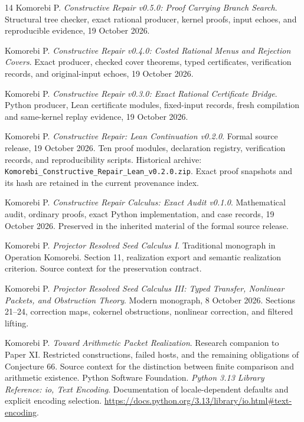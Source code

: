 \documentclass[11pt,letterpaper,oneside,openany]{book}
\theoremstyle{quiet}
\begin{document}
\backmatter
\begin{thebibliography}{14}
Komorebi P. \emph{Constructive Repair v0.5.0: Proof Carrying Branch Search}. Structural tree checker, exact rational producer, kernel proofs, input echoes, and reproducible evidence, 19 October 2026.

Komorebi P. \emph{Constructive Repair v0.4.0: Costed Rational Menus and Rejection Covers}. Exact producer, checked cover theorems, typed certificates, verification records, and original-input echoes, 19 October 2026.

Komorebi P. \emph{Constructive Repair v0.3.0: Exact Rational Certificate Bridge}. Python producer, Lean certificate modules, fixed-input records, fresh compilation and same-kernel replay evidence, 19 October 2026.

Komorebi P. \emph{Constructive Repair: Lean Continuation v0.2.0}. Formal source release, 19 October 2026. Ten proof modules, declaration registry, verification records, and reproducibility scripts. Historical archive: \nolinkurl{Komorebi_Constructive_Repair_Lean_v0.2.0.zip}. Exact proof snapshots and its hash are retained in the current provenance index.

Komorebi P. \emph{Constructive Repair Calculus: Exact Audit v0.1.0}. Mathematical audit, ordinary proofs, exact Python implementation, and case records, 19 October 2026. Preserved in the inherited material of the formal source release.

Komorebi P. \emph{Projector Resolved Seed Calculus I}. Traditional monograph in Operation Komorebi. Section 11, realization export and semantic realization criterion. Source context for the preservation contract.

Komorebi P. \emph{Projector Resolved Seed Calculus III: Typed Transfer, Nonlinear Packets, and Obstruction Theory}. Modern monograph, 8 October 2026. Sections 21--24, correction maps, cokernel obstructions, nonlinear correction, and filtered lifting.

Komorebi P. \emph{Toward Arithmetic Packet Realization}. Research companion to Paper XI. Restricted constructions, failed hosts, and the remaining obligations of Conjecture 66. Source context for the distinction between finite comparison and arithmetic existence.
Python Software Foundation. \emph{Python 3.13 Library Reference: io, Text Encoding}. Documentation of locale-dependent defaults and explicit encoding selection. \url{https://docs.python.org/3.13/library/io.html#text-encoding}.
\end{thebibliography}
\end{document}
